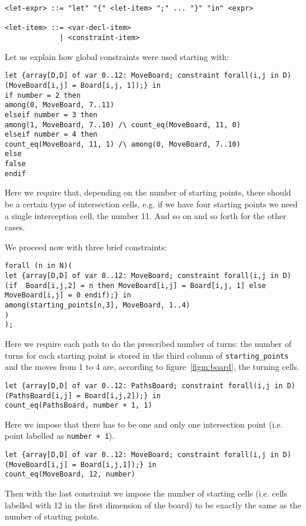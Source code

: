 \begin{verbatim}
<let-expr> ::= "let" "{" <let-item> ";" ... "}" "in" <expr>

<let-item> ::= <var-decl-item>
             | <constraint-item>
\end{verbatim}
Let us explain how global constraints were used starting with:

\begin{verbatim}
let {array[D,D] of var 0..12: MoveBoard; constraint forall(i,j in D) (MoveBoard[i,j] = Board[i,j, 1]);} in
if number = 2 then
among(0, MoveBoard, 7..11)
elseif number = 3 then
among(1, MoveBoard, 7..10) /\ count_eq(MoveBoard, 11, 0)
elseif number = 4 then
count_eq(MoveBoard, 11, 1) /\ among(0, MoveBoard, 7..10) 
else
false 
endif
\end{verbatim}
Here we require that, depending on the number of starting points, there should be a certain type of intersection cells, e.g. if we have four starting points we need a single interception cell, the number 11.
And so on and so forth for the other cases.

We proceed now with three brief constraints:
\begin{verbatim}
forall (n in N)(
let {array[D,D] of var 0..12: MoveBoard; constraint forall(i,j in D) (if  Board[i,j,2] = n then MoveBoard[i,j] = Board[i,j, 1] else MoveBoard[i,j] = 0 endif);} in
among(starting_points[n,3], MoveBoard, 1..4)
)
);
\end{verbatim}

Here we require each path to do the prescribed number of turns: the number of turns for each starting point is stored in the third column of \texttt{starting_points} and the moves from 1 to 4 are, according to figure~\ref{figm:board}, the turning cells. 
\begin{verbatim}
let {array[D,D] of var 0..12: PathsBoard; constraint forall(i,j in D) (PathsBoard[i,j] = Board[i,j,2]);} in
count_eq(PathsBoard, number + 1, 1)
\end{verbatim}
Here we impose that there has to be one and only one intersection point (i.e. point labelled as \texttt{number + 1}). 
\begin{verbatim}
let {array[D,D] of var 0..12: MoveBoard; constraint forall(i,j in D) (MoveBoard[i,j] = Board[i,j,1]);} in
count_eq(MoveBoard, 12, number)
\end{verbatim}
Then with the last constraint we impose the number of starting cells (i.e. cells labelled with 12 in the first dimension of the board) to be exactly the same as the number of starting points.
